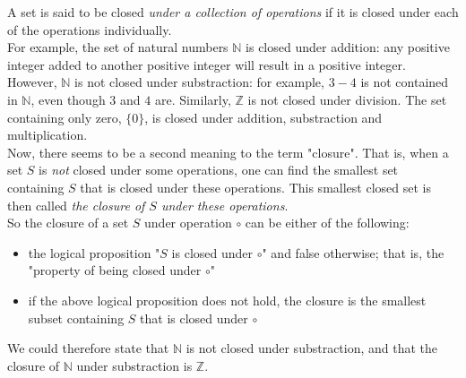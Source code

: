 \documentclass{article}
\begin{document}
A set is said to be closed \emph{under a collection of operations} if it is closed under each of the operations individually. \\

For example, the set of natural numbers \(\mathbb{N}\) is closed under addition: any positive integer added to another positive integer will result in a positive integer. However, \(\mathbb{N}\) is not closed under substraction: for example, \(3 - 4\) is not contained in \(\mathbb{N}\), even though \(3\) and \(4\) are. Similarly, \(\mathbb{Z}\) is not closed under division. The set containing only zero, \(\{0\}\), is closed under addition, substraction and multiplication. \\

Now, there seems to be a second meaning to the term "closure". That is, when a set \(S\) is \emph{not} closed under some operations, one can find the smallest set containing \(S\) that is closed under these operations. This smallest closed set is then called \emph{the closure of \(S\) under these operations}. \\

So the closure of a set \(S\) under operation \(\circ\) can be either of the following:
\begin{itemize}
	\item the logical proposition "\(S\) is closed under \(\circ\)" and false otherwise; that is, the "property of being closed under \(\circ\)"
	\item if the above logical proposition does not hold, the closure is the smallest subset containing \(S\) that is closed under \(\circ\)
\end{itemize}

We could therefore state that \(\mathbb{N}\) is not closed under substraction, and that the closure of \(\mathbb{N}\) under substraction is \(\mathbb{Z}\).
\end{document}
